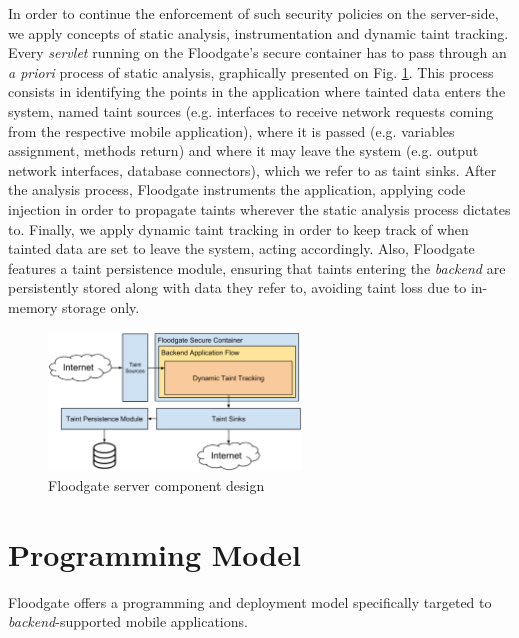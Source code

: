 In order to continue the enforcement of such security policies on the server-side, we apply concepts of static analysis, instrumentation and dynamic taint tracking. Every \textit{servlet} running on the Floodgate's secure container has to pass through an \textit{a priori} process of static analysis, graphically presented on Fig. \ref{fig:floodgate-server-blocks}. This process consists in identifying the points in the application where tainted data enters the system, named taint sources (e.g. interfaces to receive network requests coming from the respective mobile application), where it is passed (e.g. variables assignment, methods return) and where it may leave the system (e.g. output network interfaces, database connectors), which we refer to as taint sinks. After the analysis process, Floodgate instruments the application, applying code injection in order to propagate taints wherever the static analysis process dictates to. Finally, we apply dynamic taint tracking in order to keep track of when tainted data are set to leave the system, acting accordingly. Also, Floodgate features a taint persistence module, ensuring that taints entering the \textit{backend} are persistently stored along with data they refer to, avoiding taint loss due to in-memory storage only.

\begin{figure}[t!]
\includegraphics[width=0.6\textwidth]{figs/floodgate-server-blocks}
\centering
\caption{Floodgate server component design}
\label{fig:floodgate-server-blocks}
\end{figure}


\section{Programming Model}
\label{sec:programming-model}

Floodgate offers a programming and deployment model specifically targeted to \textit{backend}-supported mobile applications. 

